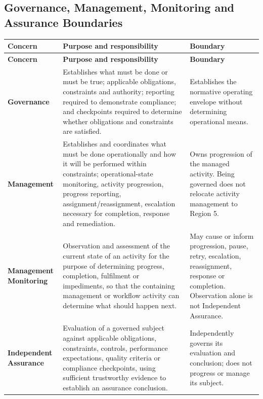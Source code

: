 \subsection*{Governance, Management, Monitoring and Assurance Boundaries}
\label{rad:business:1132}
\begingroup\small\setlength{\TableWidth}{\dimexpr\linewidth-6\tabcolsep-4\arrayrulewidth\relax}
\begin{longtable}{|>{\raggedright\arraybackslash}p{0.24\TableWidth}|>{\raggedright\arraybackslash}p{0.33\TableWidth}|>{\raggedright\arraybackslash}p{0.43\TableWidth}|}
\hline\rowcolor{TableHead}\textbf{Concern} & \textbf{Purpose and responsibility} & \textbf{Boundary}\\\hline\endfirsthead
\hline\rowcolor{TableHead}\textbf{Concern} & \textbf{Purpose and responsibility} & \textbf{Boundary}\\\hline\endhead
\hline\endfoot
\textbf{Governance} & Establishes what must be done or must be true; applicable obligations, constraints and authority; reporting required to demonstrate compliance; and checkpoints required to determine whether obligations and constraints are satisfied. & Establishes the normative operating envelope without determining operational means.\\\hline
\textbf{Management} & Establishes and coordinates what must be done operationally and how it will be performed within constraints; operational-state monitoring, activity progression, progress reporting, assignment/\allowbreak{}reassignment, escalation necessary for completion, response and remediation. & Owns progression of the managed activity. Being governed does not relocate activity management to Region 5.\\\hline
\textbf{Management Monitoring} & Observation and assessment of the current state of an activity for the purpose of determining progress, completion, fulfilment or impediments, so that the containing management or workflow activity can determine what should happen next. & May cause or inform progression, pause, retry, escalation, reassignment, response or completion. Observation alone is not Independent Assurance.\\\hline
\textbf{Independent Assurance} & Evaluation of a governed subject against applicable obligations, constraints, controls, performance expectations, quality criteria or compliance checkpoints, using sufficient trustworthy evidence to establish an assurance conclusion. & Independently governs its evaluation and conclusion; does not progress or manage its subject.\\\hline
\end{longtable}\endgroup
{}\label{rad:business:1139}

